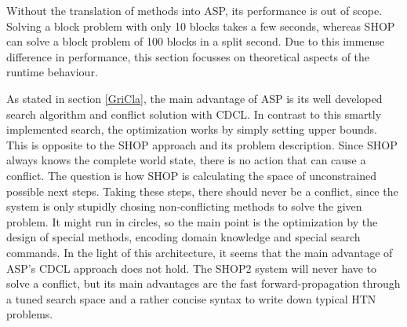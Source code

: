 \documentclass[10pt,a4paper]{article}
\begin{document}
Without the translation of methods into ASP, its performance is out of scope. Solving a block problem with only 10 blocks takes a few seconds, whereas SHOP can solve a block problem of 100 blocks in a split second. Due to this immense difference in performance, this section focusses on theoretical aspects of the runtime behaviour.

As stated in section \ref{GriCla}, the main advantage of ASP is its well developed search algorithm and conflict solution with CDCL. In contrast to this smartly implemented search, the optimization works by simply setting upper bounds. This is opposite to the SHOP approach and its problem description. Since SHOP always knows the complete world state, there is no action that can cause a conflict. The question is how SHOP is calculating the space of unconstrained possible next steps. Taking these steps, there should never be a conflict, since the system is only stupidly chosing non-conflicting methods to solve the given problem. It might run in circles, so the main point is the optimization by the design of special methods, encoding domain knowledge and special search commands. In the light of this architecture, it seems that the main advantage of ASP's CDCL approach does not hold. The SHOP2 system will never have to solve a conflict, but its main advantages are the fast forward-propagation through a tuned search space and a rather concise syntax to write down typical HTN problems.





\end{document}
